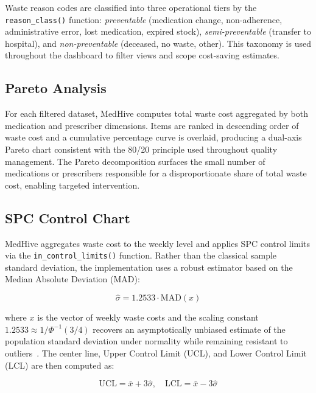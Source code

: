 \documentclass[letterpaper, 10pt, conference]{IEEEconf}
\begin{document}
Waste reason codes are classified into three operational tiers by the
\texttt{reason\_class()} function: \textit{preventable} (medication change,
non-adherence, administrative error, lost medication, expired stock),
\textit{semi-preventable} (transfer to hospital), and
\textit{non-preventable} (deceased, no waste, other).
This taxonomy is used throughout the dashboard to filter views and scope
cost-saving estimates.

\subsection{Pareto Analysis}

For each filtered dataset, MedHive computes total waste cost aggregated by
both medication and prescriber dimensions.
Items are ranked in descending order of waste cost and a cumulative percentage
curve is overlaid, producing a dual-axis Pareto chart consistent with the
80/20 principle used throughout quality management.
The Pareto decomposition surfaces the small number of medications or
prescribers responsible for a disproportionate share of total waste cost,
enabling targeted intervention.

\subsection{SPC Control Chart}

MedHive aggregates waste cost to the weekly level and applies SPC control
limits via the \texttt{in\_control\_limits()} function.
Rather than the classical sample standard deviation, the implementation uses
a robust estimator based on the Median Absolute Deviation (MAD):

\begin{equation}
  \hat{\sigma} = 1.2533 \cdot \text{MAD}(x)
\label{eq:sigma}
\end{equation}

where $x$ is the vector of weekly waste costs and the scaling constant
$1.2533 \approx 1/\Phi^{-1}(3/4)$ recovers an asymptotically unbiased
estimate of the population standard deviation under normality while
remaining resistant to outliers~\cite{Benneyan2003Statistical}.
The center line, Upper Control Limit (UCL), and Lower Control Limit (LCL)
are then computed as:

\begin{equation}
  \text{UCL} = \bar{x} + 3\hat{\sigma}, \quad
  \text{LCL} = \bar{x} - 3\hat{\sigma}
\label{eq:ucllcl}
\end{equation}
\end{document}
